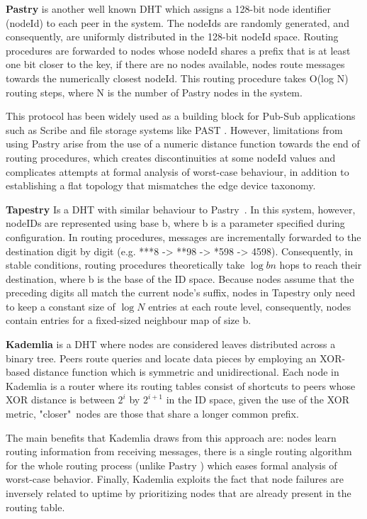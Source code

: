 \textbf{Pastry} \cite{rowstron2001pastry} is another well known DHT which assigns a 128-bit node identifier (nodeId) to each peer in the system. The nodeIds are randomly generated, and consequently, are uniformly distributed in the 128-bit nodeId space. Routing procedures are forwarded to nodes whose nodeId shares a prefix that is at least one bit closer to the key, if there are no nodes available, nodes route messages towards the numerically closest nodeId. This routing procedure takes O(log N) routing steps, where N is the number of Pastry nodes in the system. 

This protocol has been widely used as a building block for Pub-Sub applications such as Scribe \cite{10.1007/3-540-45546-9_3} and file storage systems like PAST \cite{990064}. However, limitations from using Pastry arise from the use of a numeric distance function towards the end of routing procedures, which creates discontinuities at some nodeId values and complicates attempts at formal analysis of worst-case behaviour, in addition to establishing a flat topology that mismatches the edge device taxonomy.

\textbf{Tapestry} \cite{tapestry} Is a DHT with similar behaviour to Pastry~\cite{rowstron2001pastry}. In this system, however, nodeIDs are represented using base b, where b is a parameter specified during configuration. In routing procedures, messages are incrementally forwarded to the destination digit by digit (e.g. ***8 -> **98 -> *598 -> 4598). Consequently, in stable conditions, routing procedures theoretically take $\log{b}{n}$ hops to reach their destination, where b is the base of the ID space. Because nodes assume that the preceding digits all match the current node's suffix, nodes in Tapestry only need to keep a constant size of $\log{N}$ entries at each route level, consequently, nodes contain entries for a fixed-sized neighbour map of size b.  

\textbf{Kademlia} \cite{maymounkov2002kademlia} is a DHT where nodes are considered leaves distributed across a binary tree. Peers route queries and locate data pieces by employing an XOR-based distance function which is symmetric and unidirectional. Each node in Kademlia is a router where its routing tables consist of shortcuts to peers whose XOR distance is between \(2^{i}\) by \(2^{i + 1}\) in the ID space, given the use of the XOR metric, "closer"\ nodes are those that share a longer common prefix.

The main benefits that Kademlia draws from this approach are: nodes learn routing information from receiving messages, there is a single routing algorithm for the whole routing process (unlike Pastry \cite{rowstron2001pastry}) which eases formal analysis of worst-case behavior. Finally, Kademlia exploits the fact that node failures are inversely related to uptime by prioritizing nodes that are already present in the routing table.

